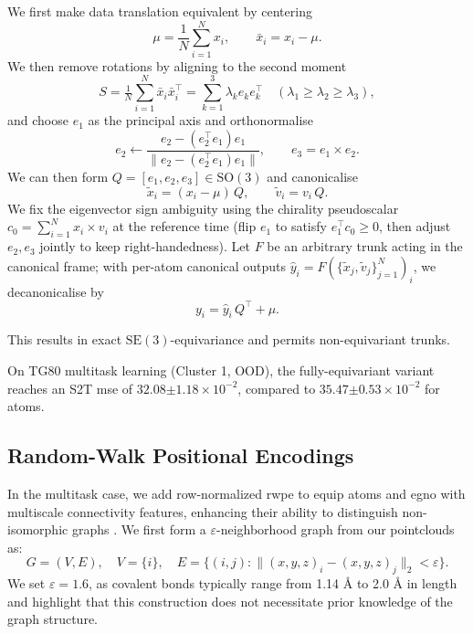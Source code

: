 We first make data translation equivalent by centering
\begin{equation}
    \mu = \frac{1}{N}\sum_{i=1}^N x_i,
    \qquad
    \bar x_i = x_i - \mu.
\end{equation}
We then remove rotations by aligning to the second moment
\begin{equation}
    S = \tfrac{1}{N}\sum_{i=1}^N \bar x_i \bar x_i^\top
    = \sum_{k=1}^3 \lambda_k e_k e_k^\top
    \quad (\lambda_1 \ge \lambda_2 \ge \lambda_3),
\end{equation}
and choose \(e_1\) as the principal axis and orthonormalise
\begin{equation}
e_2 \leftarrow \frac{e_2 - (e_2^\top e_1)e_1}{\|e_2 - (e_2^\top e_1)e_1\|}, \qquad e_3  = e_1 \times e_2.
\end{equation}
We can then form \(Q = [e_1, e_2, e_3] \in \mathrm{SO}(3)\) and canonicalise
\begin{equation}
    \tilde x_i = (x_i-\mu)\,Q,\qquad \tilde v_i = v_i\,Q.
\end{equation}
We fix the eigenvector sign ambiguity using the chirality pseudoscalar \(c_0=\sum_{i=1}^N x_i\times v_i\) at the reference time (flip \(e_1\) to satisfy \(e_1^\top c_0\ge 0\), then adjust \(e_2,e_3\) jointly to keep right-handedness).
Let \(F\) be an arbitrary trunk acting in the canonical frame; with per-atom canonical outputs \(\hat y_i=F(\{\tilde x_j,\tilde v_j\}_{j=1}^N)_i\), we decanonicalise by
\begin{equation}
    y_i=\hat y_i\,Q^\top+\mu.
\end{equation}

This results in exact \(\mathrm{SE}(3)\)-equivariance \citep{kaba_equivariance_2023} and permits non-equivariant trunks.

On TG80 multitask learning (Cluster 1, OOD), the fully-equivariant variant reaches an S2T \gls{mse} of \(32.08{\scriptstyle \pm1.18}\times10^{-2}\), compared to \(35.47{\scriptstyle \pm0.53}\times10^{-2}\) for \gls{atoms}.

\subsection{Random-Walk Positional Encodings}
\label{sec:positional_encoding}
In the multitask case, we add row-normalized \gls{rwpe} to equip \gls{atoms} and \gls{egno} with multiscale connectivity features, enhancing their ability to distinguish non-isomorphic graphs \cite{dwivedi_graph_2022, ma_graph_2023}. We first form a \(\varepsilon\)-neighborhood graph from our pointclouds as:
\begin{equation}
    G = (V,E), \quad V = \{i\}, \quad E = \{(i,j): \|(x,y,z)_i-(x,y,z)_j\|_2 < \varepsilon\}.
\end{equation}
We set \(\varepsilon = 1.6\), as covalent bonds typically range from 1.14 \AA{} to 2.0 \AA{} in length \cite{lobato_highs_2021} and highlight that this construction does not necessitate prior knowledge of the graph structure.

